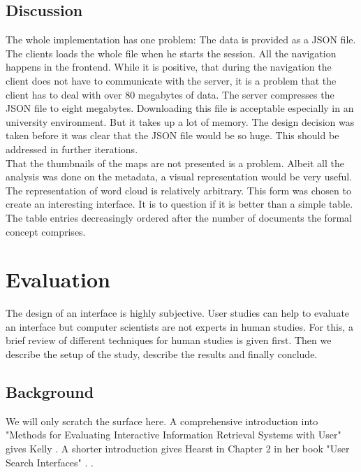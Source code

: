 \documentclass[11pt]{report}
\begin{document}
\section{Discussion}

The whole implementation has one problem: The data is provided as a JSON file. The clients loads the whole file when he starts the session. All the navigation happens in the frontend. While it is positive, that during the navigation the client does not have to communicate with the server, it is a problem that the client has to deal with over 80 megabytes of data. The server compresses the JSON file to eight megabytes. Downloading this file is acceptable especially in an university environment. But it takes up a lot of memory. The design decision was taken before it was clear that the JSON file would be so huge. This should be addressed in further iterations. \\

That the thumbnails of the maps are not presented is a problem. Albeit all the analysis was done on the metadata, a visual representation would be very useful. \\

The representation of word cloud is relatively arbitrary. This form was chosen to create an interesting interface. It is to question if it is better than a simple table. The table entries decreasingly ordered after the number of documents the formal concept comprises.

\chapter{Evaluation}
\label{Evaluation}

The design of an interface is highly subjective. User studies can help to evaluate an interface but computer scientists are not experts in human studies. For this, a brief review of different techniques for human studies is given first. Then we describe the setup of the study, describe the results and finally conclude. \\

\section{Background}

We will only scratch the surface here. A comprehensive introduction into "Methods for Evaluating Interactive Information Retrieval Systems with User" gives Kelly \cite{Kelly2007}. A shorter introduction gives Hearst in Chapter 2 in her book "User Search Interfaces" . \cite{Hearst2009}.\\
\end{document}
